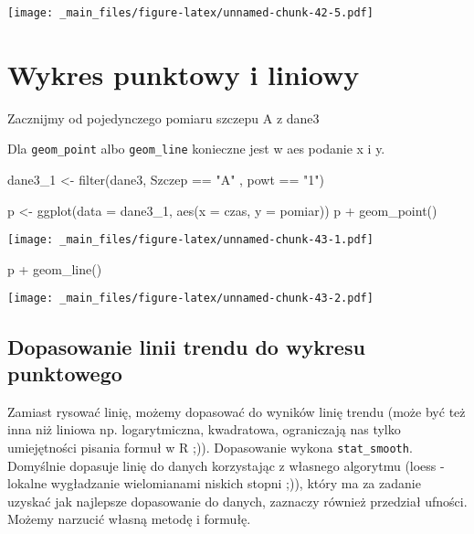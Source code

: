 \documentclass[
]{book}
\newenvironment{Shaded}{\begin{snugshade}}{\end{snugshade}}
\newcommand{\AttributeTok}[1]{\textcolor[rgb]{0.77,0.63,0.00}{#1}}
\newcommand{\FunctionTok}[1]{\textcolor[rgb]{0.00,0.00,0.00}{#1}}
\newcommand{\NormalTok}[1]{#1}
\newcommand{\OtherTok}[1]{\textcolor[rgb]{0.56,0.35,0.01}{#1}}
\newcommand{\SpecialCharTok}[1]{\textcolor[rgb]{0.00,0.00,0.00}{#1}}
\newcommand{\StringTok}[1]{\textcolor[rgb]{0.31,0.60,0.02}{#1}}
\begin{document}
\texttt{[image: \_main\_files/figure-latex/unnamed-chunk-42-5.pdf]}

\hypertarget{wykres-punktowy-i-liniowy}{%
\section{Wykres punktowy i liniowy}\label{wykres-punktowy-i-liniowy}}

Zacznijmy od pojedynczego pomiaru szczepu A z dane3

Dla \texttt{geom\_point} albo \texttt{geom\_line} konieczne jest w aes podanie x i y.

\begin{Shaded}
\begin{Highlighting}[]
\NormalTok{dane3\_1 }\OtherTok{\textless{}{-}} \FunctionTok{filter}\NormalTok{(dane3, Szczep }\SpecialCharTok{==} \StringTok{"A"}\NormalTok{ , powt }\SpecialCharTok{==} \StringTok{"1"}\NormalTok{)}

\NormalTok{p }\OtherTok{\textless{}{-}} \FunctionTok{ggplot}\NormalTok{(}\AttributeTok{data =}\NormalTok{ dane3\_1, }\FunctionTok{aes}\NormalTok{(}\AttributeTok{x =}\NormalTok{ czas, }\AttributeTok{y =}\NormalTok{ pomiar))}
\NormalTok{p }\SpecialCharTok{+} \FunctionTok{geom\_point}\NormalTok{()}
\end{Highlighting}
\end{Shaded}

\texttt{[image: \_main\_files/figure-latex/unnamed-chunk-43-1.pdf]}

\begin{Shaded}
\begin{Highlighting}[]
\NormalTok{p }\SpecialCharTok{+} \FunctionTok{geom\_line}\NormalTok{()}
\end{Highlighting}
\end{Shaded}

\texttt{[image: \_main\_files/figure-latex/unnamed-chunk-43-2.pdf]}

\hypertarget{dopasowanie-linii-trendu-do-wykresu-punktowego}{%
\subsection{Dopasowanie linii trendu do wykresu punktowego}\label{dopasowanie-linii-trendu-do-wykresu-punktowego}}

Zamiast rysować linię, możemy dopasować do wyników linię trendu (może być też inna niż liniowa np. logarytmiczna, kwadratowa, ograniczają nas tylko umiejętności pisania formuł w R ;)). Dopasowanie wykona \texttt{stat\_smooth}. Domyślnie dopasuje linię do danych korzystając z własnego algorytmu (loess - lokalne wygładzanie wielomianami niskich stopni ;)), który ma za zadanie uzyskać jak najlepsze dopasowanie do danych, zaznaczy również przedział ufności. Możemy narzucić własną metodę i formułę.
\end{document}
